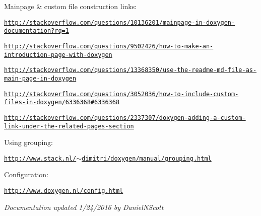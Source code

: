 Mainpage \& custom file construction links\+:
\begin{DoxyItemize}
\item \href{http://stackoverflow.com/questions/10136201/mainpage-in-doxygen-documentation?rq=1}{\tt http\+://stackoverflow.\+com/questions/10136201/mainpage-\/in-\/doxygen-\/documentation?rq=1}
\item \href{http://stackoverflow.com/questions/9502426/how-to-make-an-introduction-page-with-doxygen}{\tt http\+://stackoverflow.\+com/questions/9502426/how-\/to-\/make-\/an-\/introduction-\/page-\/with-\/doxygen}
\item \href{http://stackoverflow.com/questions/13368350/use-the-readme-md-file-as-main-page-in-doxygen}{\tt http\+://stackoverflow.\+com/questions/13368350/use-\/the-\/readme-\/md-\/file-\/as-\/main-\/page-\/in-\/doxygen}
\item \href{http://stackoverflow.com/questions/3052036/how-to-include-custom-files-in-doxygen/6336368#6336368}{\tt http\+://stackoverflow.\+com/questions/3052036/how-\/to-\/include-\/custom-\/files-\/in-\/doxygen/6336368\#6336368}
\item \href{http://stackoverflow.com/questions/2337307/doxygen-adding-a-custom-link-under-the-related-pages-section}{\tt http\+://stackoverflow.\+com/questions/2337307/doxygen-\/adding-\/a-\/custom-\/link-\/under-\/the-\/related-\/pages-\/section}
\end{DoxyItemize}

Using grouping\+:
\begin{DoxyItemize}
\item \href{http://www.stack.nl/~dimitri/doxygen/manual/grouping.html}{\tt http\+://www.\+stack.\+nl/$\sim$dimitri/doxygen/manual/grouping.\+html}
\end{DoxyItemize}

Configuration\+:
\begin{DoxyItemize}
\item \href{http://www.doxygen.nl/config.html}{\tt http\+://www.\+doxygen.\+nl/config.\+html}
\end{DoxyItemize}

{\itshape Documentation updated 1/24/2016 by Daniel\+N\+Scott} 